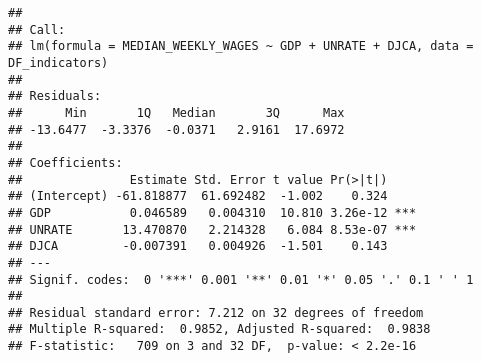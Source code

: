\documentclass[
]{article}
\begin{document}
\begin{verbatim}
## 
## Call:
## lm(formula = MEDIAN_WEEKLY_WAGES ~ GDP + UNRATE + DJCA, data = DF_indicators)
## 
## Residuals:
##      Min       1Q   Median       3Q      Max 
## -13.6477  -3.3376  -0.0371   2.9161  17.6972 
## 
## Coefficients:
##               Estimate Std. Error t value Pr(>|t|)    
## (Intercept) -61.818877  61.692482  -1.002    0.324    
## GDP           0.046589   0.004310  10.810 3.26e-12 ***
## UNRATE       13.470870   2.214328   6.084 8.53e-07 ***
## DJCA         -0.007391   0.004926  -1.501    0.143    
## ---
## Signif. codes:  0 '***' 0.001 '**' 0.01 '*' 0.05 '.' 0.1 ' ' 1
## 
## Residual standard error: 7.212 on 32 degrees of freedom
## Multiple R-squared:  0.9852, Adjusted R-squared:  0.9838 
## F-statistic:   709 on 3 and 32 DF,  p-value: < 2.2e-16
\end{verbatim}
\end{document}
